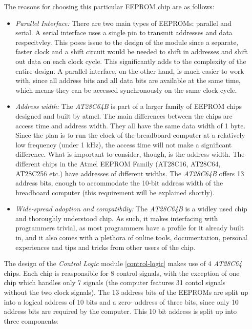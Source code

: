The reasons for choosing this particular EEPROM chip are as follows:
\begin{itemize}
  \item \emph{Parallel Interface: } There are two main types of EEPROMs: parallel and serial. A
  serial interface uses a single pin to transmit addresses and data respecitvley. This poses
  issue to the design of the module since a separate, faster clock and a shift circuit would be
  needed to shift in addresses and shift out data on each clock cycle. This significantly adds
  to the complexity of the entire design. A parallel interface, on the other hand, is much
  easier to work with, since all address bits and all data bits are available at the same time,
  which means they can be accessed synchronously on the same clock cycle.
  \item \emph{Address width: } The \emph{AT28C64B} \cite{at28c64b} is part of a larger family
  of EEPROM chips designed and built by atmel. The main differences between the chips are access
  time and address width. They all have the same data width of 1 byte. Since the plan is to
  run the clock of the breadboard computer at a relatively low frequency (under 1 kHz), the
  access time will not make a significant difference. What is important to consider, though,
  is the address width. The different chips in the Atmel EEPROM Family (AT28C16, AT28C64,
  AT28C256 etc.) have addresses of different widths. The \emph{AT28C64B} \cite{at28c64b}
  offers 13 address bits, enough to accommodate the 10-bit address width of the breadboard
  computer (this requirement will be explained shortly).
  \item \emph{Wide-spread adoption and compatibiliy: } The \emph{AT28C64B} is a widley used chip
  and thoroughly understood chip. As such, it makes interfacing with programmers trivial, as
  most programmers have a profile for it already built in, and it also comes with a plethora
  of online tools, documentation, personal experiences and tips and tricks from other users of
  the chip.
\end{itemize}
The design of the \emph{Control Logic} module \ref{control-logic} makes use of 4 \emph{AT28C64}
chips. Each chip is reasponsible for 8 control signals, with the exception of one chip which
handles only 7 signals (the computer features 31 contol signals without the two clock signals).
The 13 address bits of the EEPROMs are split up into a logical address of 10 bits and a zero-
address of three bits, since only 10 address bits are required by the computer. This 10 bit
address is split up into three components:
